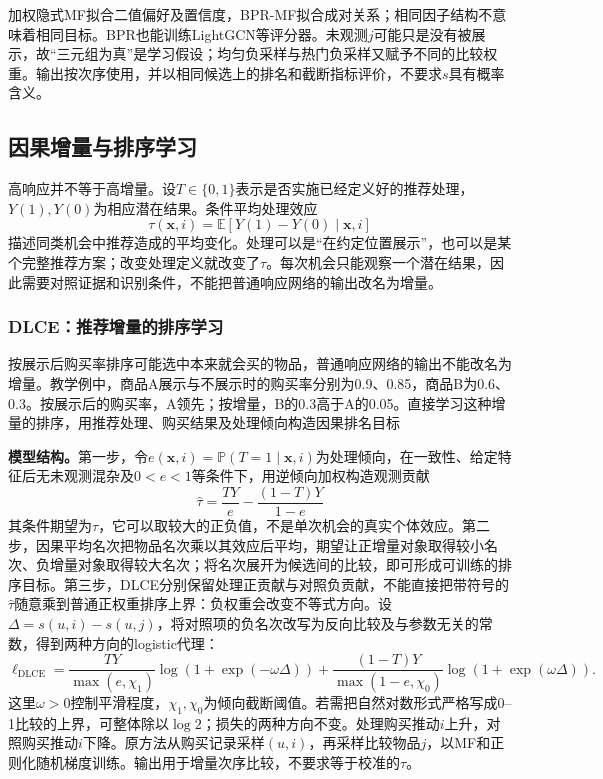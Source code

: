 加权隐式MF拟合二值偏好及置信度，BPR-MF拟合成对关系；相同因子结构不意味着相同目标。BPR也能训练LightGCN等评分器。未观测$j$可能只是没有被展示，故“三元组为真”是学习假设；均匀负采样与热门负采样又赋予不同的比较权重。输出按次序使用，并以相同候选上的排名和截断指标评价，不要求$s$具有概率含义。

\subsection{因果增量与排序学习}
\label{sec:rs-uplift-ranking}

高响应并不等于高增量。设$T\in\{0,1\}$表示是否实施已经定义好的推荐处理，$Y(1),Y(0)$为相应潜在结果。条件平均处理效应
\begin{equation}
 \tau(\bm x,i)=\mathbb E[Y(1)-Y(0)\mid\bm x,i]
 \label{eq:rs-uplift}
\end{equation}
描述同类机会中推荐造成的平均变化。处理可以是“在约定位置展示”，也可以是某个完整推荐方案；改变处理定义就改变了$\tau$。每次机会只能观察一个潜在结果，因此需要对照证据和识别条件，不能把普通响应网络的输出改名为增量。

\subsubsection{DLCE：推荐增量的排序学习}
\label{sec:rs-dlce}

按展示后购买率排序可能选中本来就会买的物品，普通响应网络的输出不能改名为增量。教学例中，商品A展示与不展示时的购买率分别为0.9、0.85，商品B为0.6、0.3。按展示后的购买率，A领先；按增量，B的0.3高于A的0.05。直接学习这种增量的排序，用推荐处理、购买结果及处理倾向构造因果排名目标

\textbf{模型结构。}第一步，令$e(\bm x,i)=\mathbb P(T=1\mid\bm x,i)$为处理倾向，在一致性、给定特征后无未观测混杂及$0<e<1$等条件下，用逆倾向加权构造观测贡献
\begin{equation}
 \widehat\tau=\frac{TY}{e}-\frac{(1-T)Y}{1-e}
 \label{eq:rs-uplift-ips}
\end{equation}
其条件期望为$\tau$，它可以取较大的正负值，不是单次机会的真实个体效应。第二步，因果平均名次把物品名次乘以其效应后平均，期望让正增量对象取得较小名次、负增量对象取得较大名次；将名次展开为候选间的比较，即可形成可训练的排序目标。第三步，DLCE分别保留处理正贡献与对照负贡献，不能直接把带符号的$\widehat\tau$随意乘到普通正权重排序上界：负权重会改变不等式方向。设$\Delta=s(u,i)-s(u,j)$，将对照项的负名次改写为反向比较及与参数无关的常数，得到两种方向的logistic代理：
\begin{equation}
 \ell_{\mathrm{DLCE}}=
 \frac{TY}{\max(e,\chi_1)}\log(1+\exp(-\omega\Delta))
 +\frac{(1-T)Y}{\max(1-e,\chi_0)}
       \log(1+\exp(\omega\Delta)).
 \label{eq:rs-dlce-loss}
\end{equation}
这里$\omega>0$控制平滑程度，$\chi_1,\chi_0$为倾向截断阈值。若需把自然对数形式严格写成0--1比较的上界，可整体除以$\log2$；损失的两种方向不变。处理购买推动$i$上升，对照购买推动$i$下降。原方法从购买记录采样$(u,i)$，再采样比较物品$j$，以MF和正则化随机梯度训练。输出用于增量次序比较，不要求等于校准的$\tau$。

